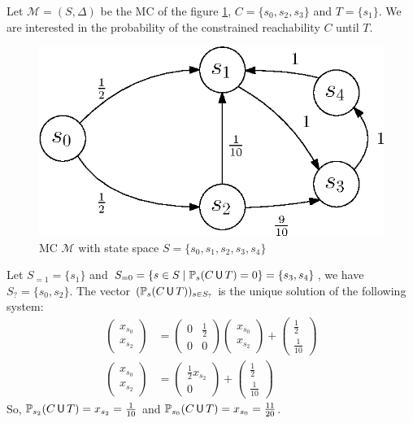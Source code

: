 \begin{example} \label{constrained-reach-example}
Let $\mathcal{M}=(S, \Delta)$ be the MC of the figure \ref{CUTexample},
 $C = \{s_0, s_2, s_3\}$ and $T = \{s_1\}$. We are interested in the probability of the constrained reachability $C$ until $T$.
  \begin{figure}[H]
    \centering
    \includegraphics[width=0.4\linewidth]{resources/CUTexample}
    \captionsetup{justification=centering}
    \caption{MC $\mathcal{M}$ with state space $S = \{s_0, s_1, s_2, s_3, s_4\}$}\label{CUTexample}
  \end{figure}
  Let $S_{=1} = \{s_1\}$ and $S_{=0} = \{s \in S \; | \; \mathbb{P}_{s}(C\,\text{\sffamily U}\, T)=0\} = \{s_3, s_4\}$, we have $S_{?} = \{s_0, s_2\}$.
  The vector $(\mathbb{P}_{s}(C \,\text{\sffamily U}\, T))_{s \in S_?}$ is the unique solution of the following system:
  \begin{align*}
  	\begin{pmatrix}
      x_{s_0}\\[0.3em]
      x_{s_2}
  	\end{pmatrix} &=
    \begin{pmatrix}
      0 & \frac{1}{2} \\[0.3em]
      0 & 0
    \end{pmatrix}
    \begin{pmatrix}
      x_{s_0}\\[0.3em]
      x_{s_2}
    \end{pmatrix}
    +
    \begin{pmatrix}
      \frac{1}{2}\\[0.3em]
      \frac{1}{10}
    \end{pmatrix} \\
    \begin{pmatrix}
      x_{s_0}\\[0.3em]
      x_{s_2}
  	\end{pmatrix} &=
    \begin{pmatrix}
      \frac{1}{2} x_{s_2} \\[0.3em]
      0
    \end{pmatrix}
    +
    \begin{pmatrix}
      \frac{1}{2}\\[0.3em]
      \frac{1}{10}
    \end{pmatrix}
  \end{align*}
  So, $\mathbb{P}_{s_2}(C \,\text{\sffamily U}\, T) = x_{s_2} = \frac{1}{10}$ and $\mathbb{P}_{s_0}(C \,\text{\sffamily U}\, T) = x_{s_0} = \frac{11}{20}$.
  \\
\end{example}

